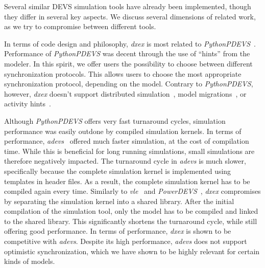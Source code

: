 Several similar \textsf{DEVS} simulation tools have already been implemented, though they differ in several key aspects.
We discuss several dimensions of related work, as we try to compromise between different tools.

In terms of code design and philosophy, \textit{dxex} is most related to \textit{PythonPDEVS}~\cite{PythonPDEVS}.
Performance of \textit{PythonPDEVS} was decent through the use of ``hints'' from the modeler.
In this spirit, we offer users the possibility to choose between different synchronization protocols.
This allows users to choose the most appropriate synchronization protocol, depending on the model.
Contrary to \textit{PythonPDEVS}, however, \textit{dxex} doesn't support distributed simulation~\cite{JDF}, model migrations~\cite{PythonPDEVS2}, or activity hints~\cite{PythonPDEVS_ACTIMS}.

Although \textit{PythonPDEVS} offers very fast turnaround cycles, simulation performance was easily outdone by compiled simulation kernels.
In terms of performance, \textit{adevs}~\cite{adevs} offered much faster simulation, at the cost of compilation time.
While this is beneficial for long running simulations, small simulations are therefore negatively impacted.
The turnaround cycle in \textit{adevs} is much slower, specifically because the complete simulation kernel is implemented using templates in header files.
As a result, the complete simulation kernel has to be compiled again every time.
Similarly to \textit{vle}~\cite{vle} and \textit{PowerDEVS}~\cite{PowerDEVS}, \textit{dxex} compromises by separating the simulation kernel into a shared library.
After the initial compilation of the simulation tool, only the model has to be compiled and linked to the shared library.
This significantly shortens the turnaround cycle, while still offering good performance.
In terms of performance, \textit{dxex} is shown to be competitive with \textit{adevs}.
Despite its high performance, \textit{adevs} does not support optimistic synchronization, which we have shown to be highly relevant for certain kinds of models.

